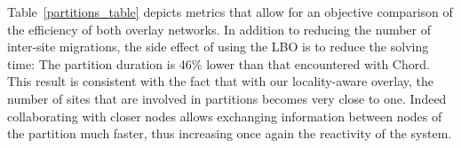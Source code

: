 
Table~\ref{partitions_table} depicts metrics that allow for an objective 
comparison of the efficiency of both overlay networks. In addition to reducing 
the number of inter-site migrations, the side effect of using the LBO is to 
reduce the solving time: The partition duration is 46\% lower than that encountered 
with Chord. This result is consistent with the fact that with our locality-aware
overlay, the number of sites that are involved in partitions becomes very close 
to one. Indeed collaborating with closer nodes allows exchanging information between
nodes of the partition much faster, thus increasing once again the reactivity
of the system.

% 
